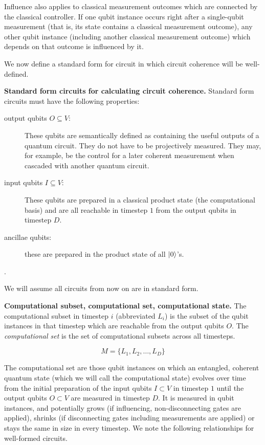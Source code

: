 Influence also applies to classical measurement outcomes which are
connected by the classical controller.
If one qubit instance occurs right after a single-qubit measurement
(that is, its state contains a classical measurement outcome), any other
qubit instance (including another classical measurement outcome) which
depends on that outcome is influenced by it.

We now define a standard form for circuit in which circuit coherence will be
well-defined.

\begin{definition}{\textbf{Standard form circuits for calculating circuit coherence.}}
Standard form circuits must have the following properties:

\begin{description}
\item[output qubits $O \subseteq V$:] These qubits are semantically defined as
containing the useful outputs of a quantum circuit. They do not have to be
projectively measured. They may, for example, be the control for a
later coherent measurement when cascaded with another quantum circuit.
\item[input qubits $I \subseteq V$:] These qubits are prepared in a 
classical product state (the computational basis)
and are all reachable in timestep $1$ from the
output qubits in timestep $D$.
\item[ancillae qubits:] these are prepared in the product state of all $\left\vert{0}\right\rangle$'s.
\end{description}
\end{definition}.

We will assume all circuits from now on are in standard form.

\begin{definition}{\textbf{Computational subset, computational set, computational state.}}
The computational subset in timestep $i$ (abbreviated $L_i$) is the subset of
the qubit instances in that timestep
which are reachable from the output qubits $O$.
The \emph{computational set} is the set of computational subsets across
all timesteps.

\begin{equation}
M = \{L_1, L_2, \ldots, L_D \}
\end{equation}
\end{definition}

The computational set are those qubit instances on which an entangled, coherent
quantum state (which we will call the computational state) evolves over time from
the initial preparation of the input qubits $I \subset V$ in timestep $1$
until the output qubits $O \subset V$ are
measured in timestep $D$.
It is measured in qubit instances,
and potentially grows (if influencing, non-disconnecting gates are applied), shrinks
(if disconnecting gates including measurements are applied) or stays the same in size
in every timestep. We note the following
relationships for well-formed circuits.

